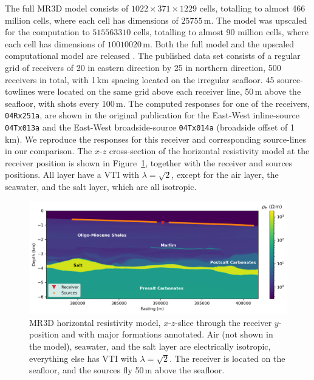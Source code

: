 \documentclass[extra, camera,%
]{gji}
\begin{document}
The full MR3D model consists of $1022 \times 371 \times 1229$ cells, totalling to almost 466 million cells, where each cell has dimensions of $25$$75$$5$\,m. The model was upscaled for the computation to $515$$563$$310$ cells, totalling to almost 90 million cells, where each cell has dimensions of $100$$100$$20$\,m. Both the full model and the upscaled computational model are released . The published data set consists of a regular grid of receivers of 20 in eastern direction by 25 in northern direction, 500 receivers in total, with 1\,km spacing located on the irregular seafloor. 45 source-towlines were located on the same grid above each receiver line, 50\,m above the seafloor, with shots every 100\,m. The computed responses for one of the receivers, \texttt{04Rx251a}, are shown in the original publication for the East-West inline-source \texttt{04Tx013a} and the East-West broadside-source \texttt{04Tx014a} (broadside offset of 1\,km). We reproduce the responses for this receiver and corresponding source-lines in our comparison. The $x$-$z$ cross-section of the horizontal resistivity model at the receiver position is shown in Figure~\ref{fig:model-marlim}, together with the receiver and sources positions. All layer have a VTI with $\lambda=\sqrt{2}$, except for the air layer, the seawater, and the salt layer, which are all isotropic.

%
\begin{figure}
  \centering
  \includegraphics[width=.9\linewidth]{figures/model-marlim.png}
  \caption{MR3D horizontal resistivity model, $x$-$z$-slice through the receiver $y$-position and with major formations annotated. Air (not shown in the model), seawater, and the salt layer are electrically isotropic, everything else has VTI with $\lambda=\sqrt{2}$. The receiver is located on the seafloor, and the sources fly 50\,m above the seafloor.}
  \label{fig:model-marlim}
\end{figure}
%
\end{document}
